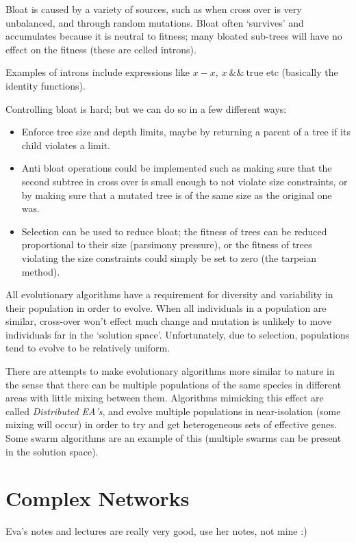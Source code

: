 Bloat is caused by a variety of sources, such as when cross over is
very unbalanced, and through random mutations. Bloat often `survives'
and accumulates because it is neutral to fitness; many bloated
sub-trees will have no effect on the fitness (these are celled
introns).

Examples of introns include expressions like $x-x$,
$x~\&\&~\mathrm{true}$ etc (basically the identity functions).

Controlling bloat is hard; but we can do so in a few different ways:
\begin{itemize}
\item Enforce tree size and depth limits, maybe by returning a parent
of a tree if its child violates a limit.
\item Anti bloat operations could be implemented such as making sure
that the second subtree in cross over is small enough to not violate
size constraints, or by making sure that a mutated tree is of the same
size as the original one was.
\item Selection can be used to reduce bloat; the fitness of trees can
be reduced proportional to their size (parsimony pressure), or the
fitness of trees violating the size constraints could simply be set to
zero (the tarpeian method).
\end{itemize}

All evolutionary algorithms have a requirement for diversity and
variability in their population in order to evolve. When all
individuals in a population are similar, cross-over won't effect much
change and mutation is unlikely to move individuals far in the
`solution space'. Unfortunately, due to selection, populations tend to
evolve to be relatively uniform.

There are attempts to make evolutionary algorithms more similar to
nature in the sense that there can be multiple populations of the same
species in different areas with little mixing between them. Algorithms
mimicking this effect are called \textit{Distributed EA's}, and evolve
multiple populations in near-isolation (some mixing will occur) in
order to try and get heterogeneous sets of effective genes. Some swarm
algorithms are an example of this (multiple swarms can be present in
the solution space).


\section{Complex Networks}

Eva's notes and lectures are really very good, use her notes, not mine :)
